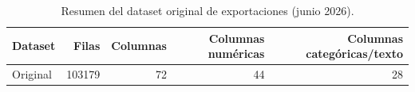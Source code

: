 \begin{table}
\caption{Resumen del dataset original de exportaciones (junio 2026).}
\label{tab:resumen_original}
\begin{tabular}{lrrrr}
\toprule
Dataset & Filas & Columnas & Columnas numéricas & Columnas categóricas/texto \\
\midrule
Original & 103179 & 72 & 44 & 28 \\
\bottomrule
\end{tabular}
\end{table}
